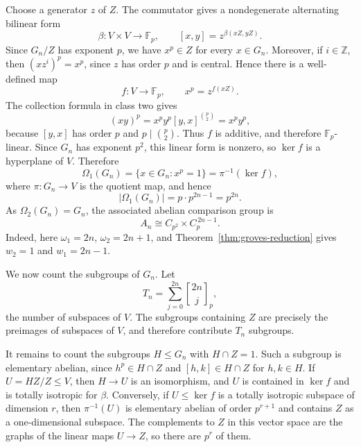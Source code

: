 \documentclass[a4paper,11pt,reqno]{amsart}
\theoremstyle{plain}
\theoremstyle{remark}
\numberwithin{equation}{section}
\newcommand{\card}[1]{\left\lvert #1\right\rvert}
\newcommand{\gauss}[2]{\genfrac{[}{]}{0pt}{}{#1}{#2}_p}
\renewcommand{\leq}{\leqslant}
\begin{document}
Choose a generator $z$ of $Z$.
The commutator gives a nondegenerate alternating bilinear form
\[
        \beta:V\times V\longrightarrow \mathbb F_p,
        \qquad
        [x,y]=z^{\beta(xZ,yZ)}.
\]
Since $G_n/Z$ has exponent $p$, we have $x^p\in Z$ for every $x\in G_n$.
Moreover, if $i\in\mathbb Z$, then $(xz^i)^p=x^p$, since $z$ has order $p$
and is central. Hence there is a well-defined map
\[
        f:V\longrightarrow \mathbb F_p,
        \qquad
        x^p=z^{f(xZ)}.
\]
The collection formula in class two gives
\[
        (xy)^p=x^py^p[y,x]^{\binom p2}=x^py^p,
\]
because $[y,x]$ has order $p$ and $p\mid \binom p2$. Thus $f$ is additive, and
therefore $\mathbb F_p$-linear. Since $G_n$ has exponent $p^2$, this linear
form is nonzero, so $\ker f$ is a hyperplane of $V$. Therefore
\[
        \Omega_1(G_n)=\{x\in G_n:x^p=1\}
        =\pi^{-1}(\ker f),
\]
where $\pi:G_n\to V$ is the quotient map, and hence
\[
        \card{\Omega_1(G_n)}=p\cdot p^{2n-1}=p^{2n}.
\]
As $\Omega_2(G_n)=G_n$, the associated abelian comparison group is
\[
        A_n\cong C_{p^2}\times C_p^{\,2n-1}.
\]
Indeed, here $\omega_1=2n$, $\omega_2=2n+1$, and Theorem~\ref{thm:groves-reduction}
gives $w_2=1$ and $w_1=2n-1$.

We now count the subgroups of $G_n$. Let
\[
        T_n=\sum_{j=0}^{2n}\gauss{2n}{j},
\]
the number of subspaces of $V$. The subgroups containing $Z$ are precisely the
preimages of subspaces of $V$, and therefore contribute $T_n$ subgroups.

It remains to count the subgroups $H\leq G_n$ with $H\cap Z=1$. Such a
subgroup is elementary abelian, since $h^p\in H\cap Z$ and
$[h,k]\in H\cap Z$ for $h,k\in H$. If $U=HZ/Z\leq V$, then $H\to U$ is
an isomorphism, and $U$ is contained in $\ker f$ and is totally isotropic
for $\beta$. Conversely, if $U\leq\ker f$ is a totally isotropic subspace of
dimension $r$, then $\pi^{-1}(U)$ is elementary abelian of order $p^{r+1}$
and contains $Z$ as a one-dimensional subspace. The complements to $Z$ in
this vector space are the graphs of the linear maps $U\to Z$, so there are
$p^r$ of them.
\end{document}
